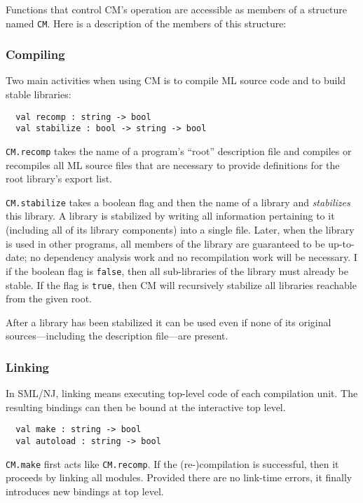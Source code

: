 \documentclass{article}
\begin{document}
Functions that control CM's operation are accessible as members of a
structure named {\tt CM}.  Here is a description of the members of
this structure:

\subsubsection*{Compiling}

Two main activities when using CM is to compile ML source code and to
build stable libraries:

\begin{verbatim}
  val recomp : string -> bool
  val stabilize : bool -> string -> bool
\end{verbatim}

{\tt CM.recomp} takes the name of a program's ``root'' description
file and compiles or recompiles all ML source files that are necessary
to provide definitions for the root library's export list.

{\tt CM.stabilize} takes a boolean flag and then the name of a library
and {\em stabilizes} this library.  A library is stabilized by writing
all information pertaining to it (including all of its library
components) into a single file.  Later, when the library is used in
other programs, all members of the library are guaranteed to be
up-to-date; no dependency analysis work and no recompilation work will
be necessary.  I if the boolean flag is {\tt false}, then all
sub-libraries of the library must already be stable.  If the flag is
{\tt true}, then CM will recursively stabilize all libraries reachable
from the given root.

After a library has been stabilized it can be used even if none of its
original sources---including the description file---are present.

\subsubsection*{Linking}

In SML/NJ, linking means executing top-level code of each compilation
unit.  The resulting bindings can then be bound at the interactive top
level.

\begin{verbatim}
  val make : string -> bool
  val autoload : string -> bool
\end{verbatim}

{\tt CM.make} first acts like {\tt CM.recomp}.  If the (re-)compilation
is successful, then it proceeds by linking all modules.  Provided
there are no link-time errors, it finally introduces new bindings at
top level.
\end{document}
